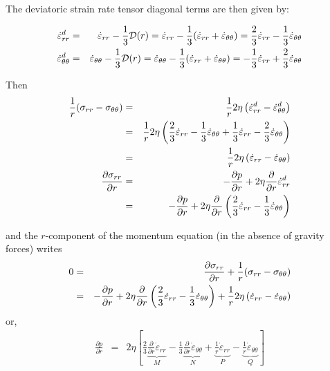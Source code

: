 The deviatoric strain rate tensor diagonal terms are then given by:

\begin{eqnarray}
\dot\varepsilon_{rr}^d  
&=& \dot\varepsilon_{rr}  -\frac13  {\cal D}(r)  
= \dot\varepsilon_{rr}  -\frac13 ( \dot\varepsilon_{rr} + \dot\varepsilon_{\theta\theta} ) 
= \frac23 \dot\varepsilon_{rr}  -\frac13  \dot\varepsilon_{\theta\theta} 
\nonumber\\
\dot\varepsilon_{\theta\theta}^d  
&=& \dot\varepsilon_{\theta\theta}  -\frac13  {\cal D}(r)  
= \dot\varepsilon_{\theta\theta}  -\frac13 ( \dot\varepsilon_{rr} + \dot\varepsilon_{\theta\theta} ) 
= -\frac13  \dot\varepsilon_{rr} + \frac23 \dot\varepsilon_{\theta\theta}  
\end{eqnarray}

Then
\begin{eqnarray}
\frac{1}{r}( \sigma_{rr} - \sigma_{\theta\theta} )
&=& 
\frac{1}{r} 2\eta \left( \dot\varepsilon_{rr}^d   - \dot\varepsilon_{\theta\theta}^d  \right) \nonumber\\
&=& 
\frac{1}{r} 2\eta \left(
\frac23 \dot\varepsilon_{rr}  -\frac13  \dot\varepsilon_{\theta\theta}
+\frac13  \dot\varepsilon_{rr} - \frac23 \dot\varepsilon_{\theta\theta}
\right)  
\nonumber\\
&=& 
\frac{1}{r} 2\eta \left( \dot\varepsilon_{rr}   - \dot\varepsilon_{\theta\theta}  \right) \nonumber\\
\frac{\partial \sigma_{rr}}{\partial r} 
&=& - \frac{\partial p}{\partial r} + 2\eta \frac{\partial }{\partial r} \dot\varepsilon_{rr}^d \nonumber\\
&=& - \frac{\partial p}{\partial r} 
+ 2\eta \frac{\partial }{\partial r}
\left(  \frac23 \dot\varepsilon_{rr}  -\frac13  \dot\varepsilon_{\theta\theta} \right) 
\end{eqnarray}

and the $r$-component of the momentum equation (in the absence of gravity forces) writes
\begin{eqnarray}
0&=& 
\frac{\partial \sigma_{rr}}{\partial r} +\frac{1}{r}( \sigma_{rr} - \sigma_{\theta\theta} )\nonumber\\
&=&
- \frac{\partial p}{\partial r} 
+ 2\eta 
\frac{\partial }{\partial r}
\left(  \frac23 \dot\varepsilon_{rr}  -\frac13  \dot\varepsilon_{\theta\theta} \right) 
+
\frac{1}{r} 2\eta \left( \dot\varepsilon_{rr}   - \dot\varepsilon_{\theta\theta}  \right) 
\end{eqnarray}
or, 
\begin{eqnarray}
\frac{\partial p}{\partial r}  
&=& 2 \eta 
\left[
\frac23 \underbrace{\frac{\partial }{\partial r}   \dot\varepsilon_{rr} }_{M} 
-\frac13 \underbrace{ \frac{\partial }{\partial r}  \dot\varepsilon_{\theta\theta} }_{N}
+ \underbrace{ \frac{1}{r} \dot\varepsilon_{rr}   }_{P}
- \underbrace{ \frac{1}{r}\dot\varepsilon_{\theta\theta} }_{Q} 
\right]
\end{eqnarray}

